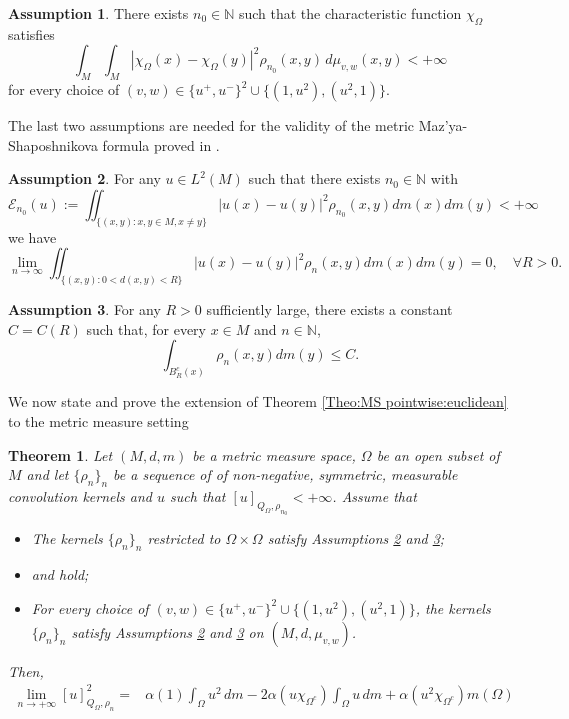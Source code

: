 \documentclass[reqno,11pt]{amsart}
\numberwithin{equation}{section}
\theoremstyle{definition} %
\theoremstyle{plain}
\newtheorem{theo}[theo]{Theorem}  %
\theoremstyle{definition}
\newtheorem{hyp}[hyp]{Assumption}
\theoremstyle{remark}
\def\Qom{{Q_\Omega}}
\def\io{\int_\Omega}
\def\semin#1#2{ [#1 ]_{#2}}
\def\N{\mathbb{N}}
\newcommand{\abs}[1]{\left|#1\right|}
\begin{document}
\begin{hyp}\label{Ass:chiOmega Sobolev}
    There exists $n_0\in\N$ such that the characteristic function $\chi_\Omega$ satisfies
    \begin{equation}
        \int_M\int_M {\abs{\chi_\Omega(x)-\chi_\Omega(y)}}^2\rho_{n_0}(x,y) \,d\mu_{v,w}(x,y) <+\infty
    \end{equation}
    for every choice of $(v,w)\in \{u^+,u^-\}^2\cup \{(1,u^2), (u^2,1)\}$.
\end{hyp}

The last two assumptions are needed for the validity of the metric Maz'ya-Shaposhnikova formula proved in \cite{HanPinamontiXu2025}.
\begin{hyp}\label{Ass:vanishes_on_bounded} 
For any $u \in L^2(M)$ such that there exists $n_0 \in \mathbb{N}$ with
$$
\mathcal{E}_{n_0}(u):=\iint_{\{(x, y): x, y \in M, x \neq y\}}|u(x)-u(y)|^2 \rho_{n_0}(x, y) dm(x) dm(y)<+\infty
$$
we have
\begin{equation}
    \label{Eq:ass_mass_at_infinity}
    \lim _{n \rightarrow \infty} \iint_{\{(x, y): 0<{d}(x, y)<R\}}
|u(x)-u(y)|^2 \rho_n(x, y) dm(x) dm(y)=0, \quad \forall R>0.
\end{equation}


\end{hyp}

\begin{hyp}\label{Ass:finite mass at infinity}
For any $R>0$ sufficiently large, there exists a constant $C=C(R)$ such that, for every $x \in M$ and $n \in \mathbb{N}$,
$$
\int_{B_R^c(x)} \rho_n(x, y) {dm}(y) \leq C.
$$
\end{hyp}

We now state and prove the extension of Theorem \ref{Theo:MS pointwise:euclidean} to the metric measure setting
\begin{theo}\label{Theo:MS pointwise:mms}
    Let $(M,d,m)$ be a metric measure space, $\Omega$ be an open subset of $M$ and let $\{\rho_n\}_n$ be a sequence of of non-negative, symmetric, measurable convolution kernels and $u$ such that $\semin{u}{\Qom,\rho_{n_0}}<+\infty$.
    Assume that 
    \begin{itemize}
        \item The kernels $\{\rho_n\}_n$ restricted to $\Omega\times \Omega$ satisfy Assumptions \ref{Ass:vanishes_on_bounded} and \ref{Ass:finite mass at infinity};
        \item {} and  hold;
        \item For every choice of $(v,w)\in \{u^+,u^-\}^2\cup \{(1,u^2), (u^2,1)\}$, the kernels $\{\rho_n\}_n$ satisfy Assumptions \ref{Ass:vanishes_on_bounded} and \ref{Ass:finite mass at infinity} on $(M,d,\mu_{v,w})$.
    \end{itemize}
    Then,
    \begin{equation}
    \begin{split}
        \lim_{n\to+\infty}\semin{u}{Q_\Omega,\rho_n}^2
        =
        &\alpha(1)\io u^2\,dm
        -2\alpha(u\chi_{\Omega^c})\io u\,dm
        +\alpha(u^2\chi_{\Omega^c})m(\Omega)
    \end{split}
    \end{equation}
\end{theo}
\end{document}
